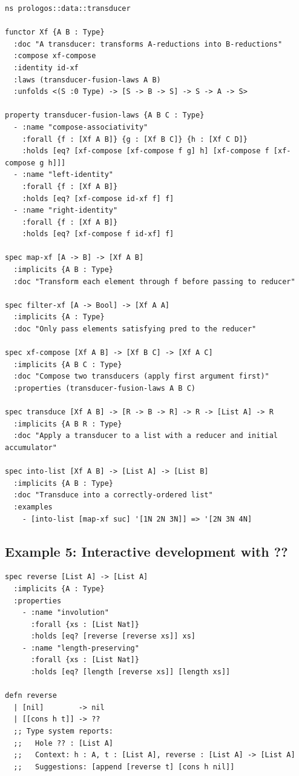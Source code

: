 \documentclass[11pt]{article}
\begin{document}
\begin{verbatim}
ns prologos::data::transducer

functor Xf {A B : Type}
  :doc "A transducer: transforms A-reductions into B-reductions"
  :compose xf-compose
  :identity id-xf
  :laws (transducer-fusion-laws A B)
  :unfolds <(S :0 Type) -> [S -> B -> S] -> S -> A -> S>

property transducer-fusion-laws {A B C : Type}
  - :name "compose-associativity"
    :forall {f : [Xf A B]} {g : [Xf B C]} {h : [Xf C D]}
    :holds [eq? [xf-compose [xf-compose f g] h] [xf-compose f [xf-compose g h]]]
  - :name "left-identity"
    :forall {f : [Xf A B]}
    :holds [eq? [xf-compose id-xf f] f]
  - :name "right-identity"
    :forall {f : [Xf A B]}
    :holds [eq? [xf-compose f id-xf] f]

spec map-xf [A -> B] -> [Xf A B]
  :implicits {A B : Type}
  :doc "Transform each element through f before passing to reducer"

spec filter-xf [A -> Bool] -> [Xf A A]
  :implicits {A : Type}
  :doc "Only pass elements satisfying pred to the reducer"

spec xf-compose [Xf A B] -> [Xf B C] -> [Xf A C]
  :implicits {A B C : Type}
  :doc "Compose two transducers (apply first argument first)"
  :properties (transducer-fusion-laws A B C)

spec transduce [Xf A B] -> [R -> B -> R] -> R -> [List A] -> R
  :implicits {A B R : Type}
  :doc "Apply a transducer to a list with a reducer and initial accumulator"

spec into-list [Xf A B] -> [List A] -> [List B]
  :implicits {A B : Type}
  :doc "Transduce into a correctly-ordered list"
  :examples
    - [into-list [map-xf suc] '[1N 2N 3N]] => '[2N 3N 4N]
\end{verbatim}
\subsection{Example 5: Interactive development with ??}
\label{sec:orge80ea14}

\begin{verbatim}
spec reverse [List A] -> [List A]
  :implicits {A : Type}
  :properties
    - :name "involution"
      :forall {xs : [List Nat]}
      :holds [eq? [reverse [reverse xs]] xs]
    - :name "length-preserving"
      :forall {xs : [List Nat]}
      :holds [eq? [length [reverse xs]] [length xs]]

defn reverse
  | [nil]        -> nil
  | [[cons h t]] -> ??
  ;; Type system reports:
  ;;   Hole ?? : [List A]
  ;;   Context: h : A, t : [List A], reverse : [List A] -> [List A]
  ;;   Suggestions: [append [reverse t] [cons h nil]]
\end{verbatim}
\end{document}
